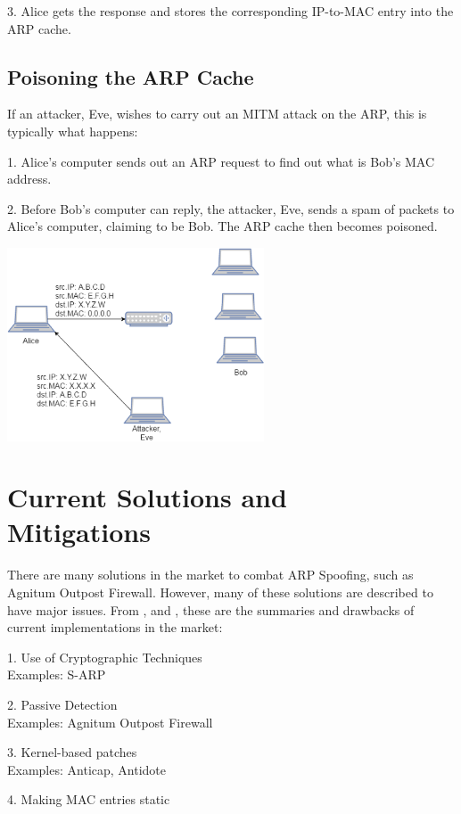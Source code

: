 \documentclass{acm_proc_article-sp}
\begin{document}
3. Alice gets the response and stores the corresponding IP-to-MAC entry into the ARP cache. 


\subsection{Poisoning the ARP Cache}
If an attacker, Eve, wishes to carry out an MITM attack on the ARP, this is typically what happens: 

1. Alice's computer sends out an ARP request to find out what is Bob's MAC address. 

2. Before Bob's computer can reply, the attacker, Eve, sends a spam of packets to Alice's computer, claiming to be Bob. The ARP cache then becomes poisoned. 

\includegraphics[width=3in]{Poisoned_ARP.eps}


\section{Current Solutions and \\Mitigations}
There are many solutions in the market to combat ARP Spoofing, such as Agnitum Outpost Firewall. However, many of these solutions are described to have major issues. From \cite{vivek:arp}, \cite{navid:arp2} and \cite{goldendeep:arp3},  these are the summaries and drawbacks of current implementations in the market:

1. Use of Cryptographic Techniques \\
Examples: S-ARP 

2. Passive Detection \\
Examples: Agnitum Outpost Firewall

3. Kernel-based patches\\
Examples: Anticap, Antidote 

4. Making MAC entries static\\ 
\end{document}
